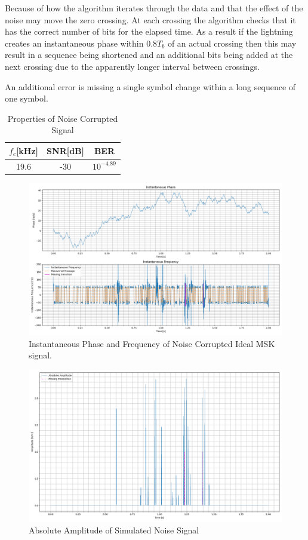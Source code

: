 Because of how the algorithm iterates through the data and that the effect of the noise may move the zero crossing. At each crossing the algorithm checks that it has the correct number of bits for the elapsed time. As a result if the lightning creates an instantaneous phase within $0.8T_b$ of an actual crossing then this may result in a sequence being shortened and an additional bits being added at the next crossing due to the apparently longer interval between crossings. 

An additional error is missing a single symbol change within a long sequence of one symbol.

\begin{table}[h!]
    \centering
    \begin{tabular}{c|c|c}
        $f_c$[kHz]&SNR[dB] & BER \\
        \hline
        19.6 &-30 & $10^{-4.89}$
    \end{tabular}
    \caption{Properties of Noise Corrupted Signal}
    \label{tab:simProp}
\end{table}

\begin{figure}[h!]
    \centering
    \includegraphics[width = \textwidth]{figs/sim/symRecovery/noiseFreq.png}
    \caption{Instantaneous Phase and Frequency of Noise Corrupted Ideal MSK signal.}
    \label{fig:noisefreq}
\end{figure}

\begin{figure}[h!]
    \centering
    \includegraphics[width = \textwidth]{figs/sim/symRecovery/NoiseAmp.png}
    \caption{Absolute Amplitude of Simulated Noise Signal}
    \label{fig:noiseamp}
\end{figure}

